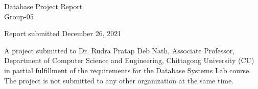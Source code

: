 \begin{titlepage}
\begin{center}
    {\large
      Database Project Report %
    }\\
    \vspace{0.2cm}
    {\Large
      Group-05 %
    }
  \end{center}
  \vfill
  
  \begin{center}
  Report submitted December 26, 2021
  \end{center}
	\vfill
A project submitted to Dr. Rudra Pratap Deb Nath, Associate Professor, Department of Computer Science and Engineering, Chittagong University (CU) in partial fulfillment of the requirements for the Database Systems Lab course. The project is not submitted to any other organization at the same time. 

\end{titlepage}
\clearpage
